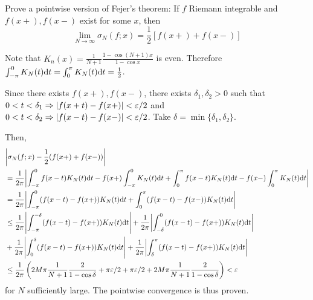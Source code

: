 \documentclass[a4paper, 12pt]{article}
\begin{document}
\begin{problem} 
    Prove a pointwise version of Fejer's theorem: If $f$ Riemann integrable and $f(x+), f(x-)$ exist for some $x$, then \begin{equation*}
    \lim_{N \to \infty} \sigma_N(f; x) = \frac{1}{2} [f(x+) + f(x-)]
    \end{equation*}
\end{problem}
\begin{solution}
    Note that $K_n(x) = \frac{1}{N+1} \frac{1 - \cos(N+1)x}{1 - \cos x}$ is even. Therefore $\int_{-\pi}^{0} K_N(t) \mathrm{d} t = \int_{0}^{\pi} K_N(t) \mathrm{d} t = \frac{1}{2}$.

    Since there exists $f(x+), f(x-)$, there exists $\delta_1, \delta_2 > 0$ such that $0 < t < \delta_1 \Rightarrow \lvert f(x+t) - f(x+)\rvert < \varepsilon/2$  and $0 < t < \delta_2 \Rightarrow \lvert f(x-t) - f(x-)\rvert < \varepsilon/2$. Take $\delta = \min\{\delta_1, \delta_2\}$.

    Then, \begin{align*}
        &\abs*{\sigma_N(f; x) - \frac{1}{2} (f(x+) + f(x-))} \\
        &= \frac{1}{2\pi} \abs*{\int_{-\pi}^{0}f(x-t) K_N(t) \dt - f(x+) \int_{-\pi}^{0} K_N(t) \dt + \int_{0}^{\pi} f(x-t) K_N(t) \dt - f(x-) \int_{0}^{\pi} K_N(t) \dt }\\
        &= \frac{1}{2\pi} \abs*{\int_{-\pi}^{0} (f(x-t) - f(x+)) K_N(t) \dt + \int_{0}^{\pi} (f(x-t) - f(x-)) K_N(t) \dt} \\
        &\leq \frac{1}{2\pi} \abs*{\int_{-\pi}^{-\delta} (f(x-t) - f(x+)) K_N(t) \dt} + \frac{1}{2\pi} \abs*{\int_{-\delta}^{0} (f(x-t) - f(x+)) K_N(t) \dt} \\
        &+ \frac{1}{2\pi} \abs*{\int_{0}^{\delta} (f(x-t) - f(x+)) K_N(t) \dt} + \frac{1}{2\pi} \abs*{\int_{\delta}^{\pi} (f(x-t) - f(x+)) K_N(t) \dt} \\
        &\leq \frac{1}{2\pi} \left(2M\pi \frac{1}{N+1} \frac{2}{1 - \cos \delta} + \pi \epsilon/2 + \pi \epsilon/2 + 2M \pi \frac{1}{N+1} \frac{2}{1 - \cos \delta}\right) < \epsilon
    \end{align*}
    for $N$ sufficiently large. The pointwise convergence is thus proven.
\end{solution}
\end{document}
